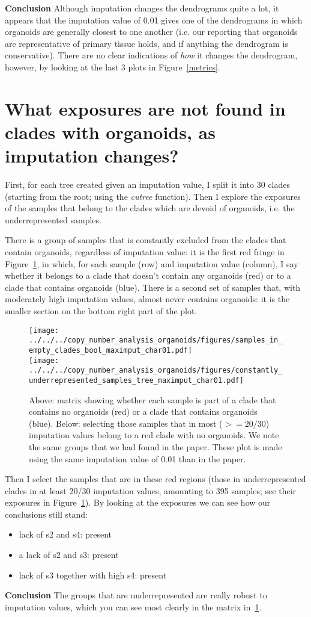 \documentclass[11pt,a4paper,roman]{article}
\begin{document}
\textbf{Conclusion} Although imputation changes the dendrograms quite a lot, it appears that the imputation value of 0.01 gives one of the dendrograms in which organoids are generally closest to one another (i.e. our reporting that organoids are representative of primary tissue holds, and if anything the dendrogram is conservative). There are no clear indications of \emph{how} it changes the dendrogram, however, by looking at the last 3 plots in Figure~\ref{metrics}.

\section{What exposures are not found in clades with organoids, as imputation changes?}
First, for each tree created given an imputation value, I split it into 30 clades (starting from the root; using the \emph{cutree} function). Then I explore the exposures of the samples that belong to the clades which are devoid of organoids, i.e. the underrepresented samples.

There is a group of samples that is constantly excluded from the clades that contain organoids, regardless of imputation value: it is the first red fringe in Figure~\ref{depleted}, in which, for each sample (row) and imputation value (column), I say whether it belongs to a clade that doesn't contain any organoids (red) or to a clade that contains organoids (blue). There is a second set of samples that, with moderately high imputation values, almost never contains organoids: it is the smaller section on the bottom right part of the plot.
\begin{figure}[h]
\centering
\texttt{[image: ../../../copy\_number\_analysis\_organoids/figures/samples\_in\_empty\_clades\_bool\_maximput\_char01.pdf]}\\
\texttt{[image: ../../../copy\_number\_analysis\_organoids/figures/constantly\_underrepresented\_samples\_tree\_maximput\_char01.pdf]}
\caption{Above: matrix showing whether each sample is part of a clade that contains no organoids (red) or a clade that contains organoids (blue). Below: selecting those samples that in most ($>=20/30$) imputation values belong to a red clade with no organoids. We note the same groups that we had found in the paper. These plot is made using the same imputation value of 0.01 than in the paper. \label{depleted}}
\end{figure}

Then I select the samples that are in these red regions (those in underrepresented clades in at least 20/30 imputation values, amounting to 395 samples; see their exposures in Figure~\ref{depleted}). By looking at the exposures we can see how our conclusions still stand:

\begin{itemize}
\item lack of s2 and s4: present
\item a lack of s2 and s3: present
\item lack of s3 together with high s4: present
\end{itemize}

\textbf{Conclusion} The groups that are underrepresented are really robust to imputation values, which you can see most clearly in the matrix in~\ref{depleted}.
\end{document}
